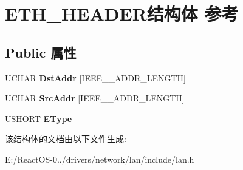 \hypertarget{struct_e_t_h___h_e_a_d_e_r}{}\section{E\+T\+H\+\_\+\+H\+E\+A\+D\+E\+R结构体 参考}
\label{struct_e_t_h___h_e_a_d_e_r}
\subsection*{Public 属性}
\begin{DoxyCompactItemize}
\item 
\mbox{\label{struct_e_t_h___h_e_a_d_e_r_aea655053c4890e20f990861b04806c9c}} 
U\+C\+H\+AR {\bfseries Dst\+Addr} \mbox{[}I\+E\+E\+E\+\_\+\_\+\+A\+D\+D\+R\+\_\+\+L\+E\+N\+G\+TH\mbox{]}
\item 
\mbox{\label{struct_e_t_h___h_e_a_d_e_r_a1e8a0fe6603237c4247f26dfee880aab}} 
U\+C\+H\+AR {\bfseries Src\+Addr} \mbox{[}I\+E\+E\+E\+\_\+\_\+\+A\+D\+D\+R\+\_\+\+L\+E\+N\+G\+TH\mbox{]}
\item 
\mbox{\label{struct_e_t_h___h_e_a_d_e_r_a22b223478c4916cac5557ee2a04b8aa8}} 
U\+S\+H\+O\+RT {\bfseries E\+Type}
\end{DoxyCompactItemize}


该结构体的文档由以下文件生成\+:\begin{DoxyCompactItemize}
\item 
E\+:/\+React\+O\+S-\/0../drivers/network/lan/include/lan.\+h\end{DoxyCompactItemize}

